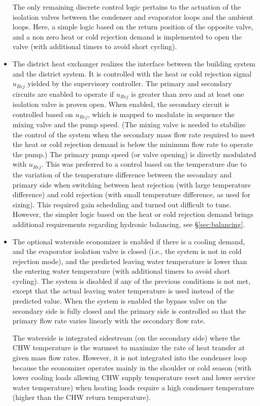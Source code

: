 \begin{itemize}
    The only remaining discrete control logic pertains to the actuation of the isolation valves between the condenser and evaporator loops and the ambient loops. Here, a simple logic based on the return position of the opposite valve, and a non zero heat or cold rejection demand is implemented to open the valve (with additional timers to avoid short cycling).

    \item The district heat exchanger realizes the interface between the building system and the district system. It is controlled with the heat or cold rejection signal $u_{Rej}$ yielded by the supervisory controller.
    The primary and secondary circuits are enabled to operate if $u_{Rej}$ is greater than zero and at least one isolation valve is proven open.
    When enabled, the secondary circuit is controlled based on $u_{Rej}$, which is mapped to modulate in sequence the mixing valve and the pump speed. (The mixing valve is needed to stabilize the control of the system when the secondary mass flow rate required to meet the heat or cold rejection demand is below the minimum flow rate to operate the pump.)
    The primary pump speed (or valve opening) is directly modulated with $u_{Rej}$. This was preferred to a control based on the temperature due to the variation of the temperature difference between the secondary and primary side when switching between heat rejection (with large temperature difference) and cold rejection (with small temperature difference, as used for sizing). This required gain scheduling and turned out difficult to tune. However, the simpler logic based on the heat or cold rejection demand brings additional requirements regarding hydronic balancing, see §\ref{sec:balancing}.

    \item The optional waterside economizer is enabled if there is a cooling demand, and the evaporator isolation valve is closed (i.e., the system is not in cold rejection mode), and the predicted leaving water temperature is lower than the entering water temperature (with additional timers to avoid short cycling). The system is disabled if any of the previous conditions is not met, except that the actual leaving water temperature is used instead of the predicted value.
    When the system is enabled the bypass valve on the secondary side is fully closed and the primary side is controlled so that the primary flow rate varies linearly with the secondary flow rate.

    The waterside is integrated sidestream (on the secondary side) where the CHW temperature is the warmest to maximize the rate of heat transfer at given mass flow rates. However, it is not integrated into the condenser loop because the economizer operates mainly in the shoulder or cold season (with lower cooling loads allowing CHW supply temperature reset and lower service water temperature) when heating loads require a high condenser temperature (higher than the CHW return temperature).


\end{itemize}
